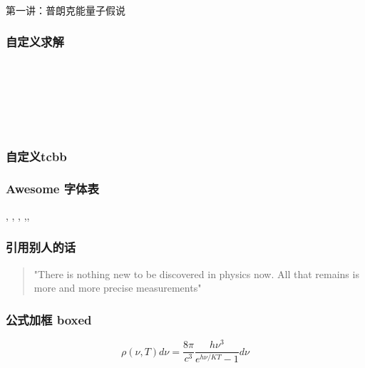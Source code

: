 \begin{frame} [plain]
  \frametitle{}
  \Background[1] 
  \begin{center}
  { {\huge 第一讲：普朗克能量子假说 }}
  \end{center}  
  \addtocounter{framenumber}{-1}   
\end{frame}

\begin{frame}
  \frametitle{自定义求解}
  \解	\\
  \Solution \\
  
  \Tips \\
  \Note \\
  \证 \\
\end{frame}

\begin{frame}
  \frametitle{自定义tcbb}
\end{frame}

\begin{frame}
  \frametitle{Awesome 字体表}
  \alert{\faHeartbeat, \faStar, \faThumbTack, \faThumbsUp,\faUniversity, \faCircle} 
\end{frame}

\begin{frame}
  \frametitle{引用别人的话}
  \begin{quotation}
    "There is nothing new to be discovered in physics now. All that remains is 
    more and more precise measurements"   \\
\end{quotation}  
\end{frame}

\begin{frame}
  \frametitle{公式加框 boxed}
  \begin{equation}
    \boxed{\rho(\nu, T) d \nu=\frac{8 \pi}{c^{3}} \frac{h \nu^{3}}{e^{h \nu / K T}-1} d \nu}
  \end{equation}
 
\end{frame}

